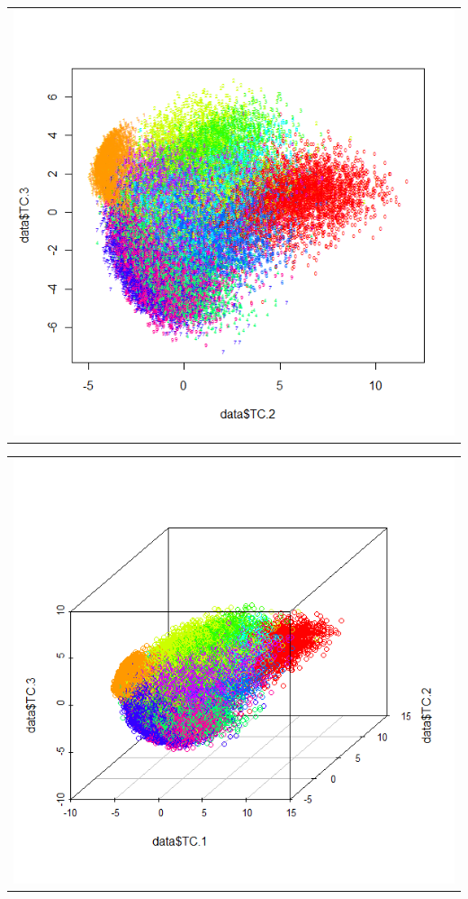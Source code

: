 \begin{table}[h!]
\begin{subtable}{.5\linewidth}
\begin{tabular}{c}
	\includegraphics[scale=0.4]{exp5/AllVsAll/PCA-23}
\end{tabular}
\end{subtable}
\begin{subtable}{.5\linewidth}
\begin{tabular}{c}
	\includegraphics[scale=0.4]{exp5/AllVsAll/PCA-123}
\end{tabular}
\end{subtable}
\end{table}
